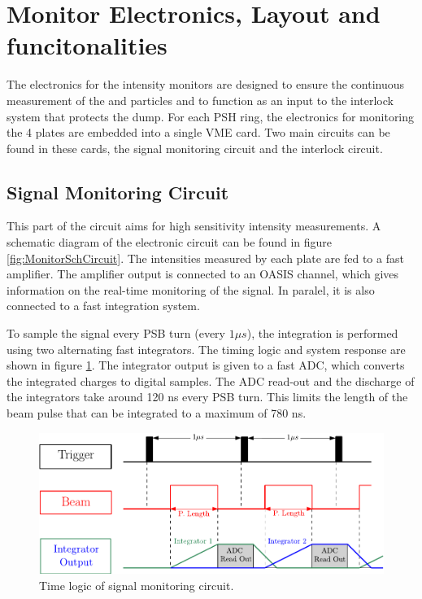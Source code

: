 \section{Monitor Electronics, Layout and funcitonalities}

The electronics for the \hzhm intensity monitors are designed to ensure the continuous measurement of the \hzz and \hm particles and to function as an input to the interlock system that protects the \hzhm dump. For each PSH ring, the electronics for monitoring the 4 plates are embedded into a single VME card. Two main circuits can be found in these cards, the signal monitoring circuit and the interlock circuit. 

\subsection{Signal Monitoring Circuit}

This part of the circuit aims for high sensitivity intensity measurements. A schematic diagram of the electronic circuit can be found in figure \ref{fig:MonitorSchCircuit}. The intensities measured by each plate are fed to a fast amplifier. The amplifier output is connected to an OASIS channel, which gives information on the real-time monitoring of the signal. In paralel, it is also connected to a fast integration system. 

To sample the signal every PSB turn (every $1 \mu s$), the integration is performed using two alternating fast integrators. The timing logic and system response are shown in figure \ref{fig:TimeResponse}. The integrator output is given to a fast ADC, which converts the integrated charges to digital samples. The ADC read-out and the discharge of the integrators take around 120 ns every PSB turn. This limits the length of the beam pulse that can be integrated to a maximum of 780 ns.

\begin{figure}[h]
    \centering
    \includegraphics[width=0.8\columnwidth]{Figure_ElectronicSchema/TimeSchema.pdf}
    \caption{Time logic of signal monitoring circuit.}
    \label{fig:TimeResponse}
\end{figure}

